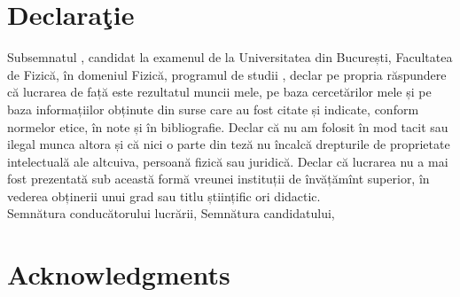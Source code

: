 \chapter*{Declaraţie}

Subsemnatul {\sffamily\color{maincolor}\studentname}, candidat la examenul de {\sffamily\color{maincolor}\tipteza} la Universitatea din București, Facultatea de Fizică, în domeniul {\sffamily\color{maincolor} Fizică}, programul de studii {\sffamily\color{maincolor}\domeniu}, declar pe propria răspundere că lucrarea de față este rezultatul muncii mele, pe baza cercetărilor mele și pe baza informațiilor obținute din surse care au fost citate și indicate, conform normelor etice, în note și în bibliografie. Declar că nu am folosit în mod tacit sau ilegal munca altora și că nici o parte din teză nu încalcă drepturile de proprietate intelectuală ale altcuiva, persoană fizică sau juridică. Declar că lucrarea nu a mai fost prezentată sub această formă vreunei instituții de învățămînt superior, în vederea obținerii unui grad sau titlu științific ori didactic.
\\[1cm]
Semnătura conducătorului lucrării,\hspace{4cm} Semnătura candidatului,

\chapter*{Acknowledgments}
